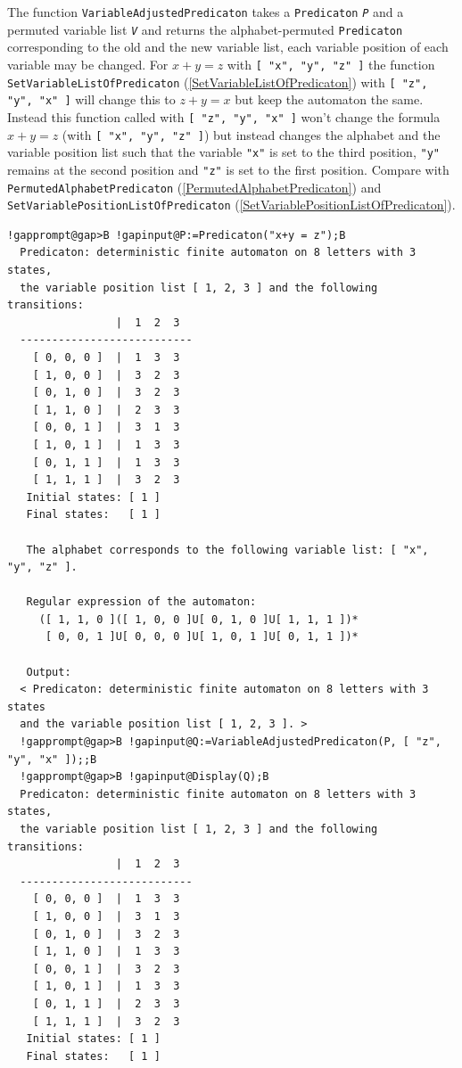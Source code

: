 \documentclass[a4paper,11pt]{report}
\begin{document}
{{{ The function \texttt{VariableAdjustedPredicaton} takes a \texttt{Predicaton} \mbox{\texttt{\mdseries\slshape P}} and a permuted variable list \mbox{\texttt{\mdseries\slshape V}} and returns the alphabet-permuted \texttt{Predicaton} corresponding to the old and the new variable list, each variable position of
each variable may be changed. For $x+y = z$ with \texttt{[ "x", "y", "z" ]} the function \texttt{SetVariableListOfPredicaton} (\ref{SetVariableListOfPredicaton}) with \texttt{[ "z", "y", "x" ]} will change this to $z+y = x$ but keep the automaton the same. Instead this function called with \texttt{[ "z", "y", "x" ]} won't change the formula $x+y = z$ (with \texttt{[ "x", "y", "z" ]}) but instead changes the alphabet and the variable position list such that
the variable \texttt{"x"} is set to the third position, \texttt{"y"} remains at the second position and \texttt{"z"} is set to the first position. Compare with \texttt{PermutedAlphabetPredicaton} (\ref{PermutedAlphabetPredicaton}) and \texttt{SetVariablePositionListOfPredicaton} (\ref{SetVariablePositionListOfPredicaton}). 
\begin{Verbatim}[commandchars=!@B,fontsize=\small,frame=single,label=Example]
  !gapprompt@gap>B !gapinput@P:=Predicaton("x+y = z");B
  Predicaton: deterministic finite automaton on 8 letters with 3 states, 
  the variable position list [ 1, 2, 3 ] and the following transitions:
                 |  1  2  3  
  ---------------------------
    [ 0, 0, 0 ]  |  1  3  3  
    [ 1, 0, 0 ]  |  3  2  3  
    [ 0, 1, 0 ]  |  3  2  3  
    [ 1, 1, 0 ]  |  2  3  3  
    [ 0, 0, 1 ]  |  3  1  3  
    [ 1, 0, 1 ]  |  1  3  3  
    [ 0, 1, 1 ]  |  1  3  3  
    [ 1, 1, 1 ]  |  3  2  3  
   Initial states: [ 1 ]
   Final states:   [ 1 ]
  
   The alphabet corresponds to the following variable list: [ "x", "y", "z" ].
  
   Regular expression of the automaton:
     ([ 1, 1, 0 ]([ 1, 0, 0 ]U[ 0, 1, 0 ]U[ 1, 1, 1 ])*
      [ 0, 0, 1 ]U[ 0, 0, 0 ]U[ 1, 0, 1 ]U[ 0, 1, 1 ])*
  
   Output:
  < Predicaton: deterministic finite automaton on 8 letters with 3 states 
  and the variable position list [ 1, 2, 3 ]. >
  !gapprompt@gap>B !gapinput@Q:=VariableAdjustedPredicaton(P, [ "z", "y", "x" ]);;B
  !gapprompt@gap>B !gapinput@Display(Q);B
  Predicaton: deterministic finite automaton on 8 letters with 3 states, 
  the variable position list [ 1, 2, 3 ] and the following transitions:
                 |  1  2  3  
  ---------------------------
    [ 0, 0, 0 ]  |  1  3  3  
    [ 1, 0, 0 ]  |  3  1  3  
    [ 0, 1, 0 ]  |  3  2  3  
    [ 1, 1, 0 ]  |  1  3  3  
    [ 0, 0, 1 ]  |  3  2  3  
    [ 1, 0, 1 ]  |  1  3  3  
    [ 0, 1, 1 ]  |  2  3  3  
    [ 1, 1, 1 ]  |  3  2  3  
   Initial states: [ 1 ]
   Final states:   [ 1 ]
  

\end{Verbatim}}}}
\end{document}
